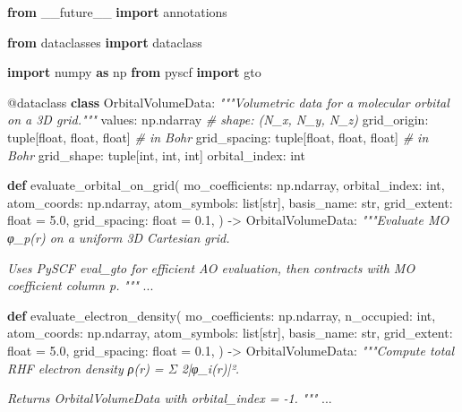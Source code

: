 \documentclass[
  11pt,
]{report}
\newenvironment{Shaded}{}{}
\newcommand{\AttributeTok}[1]{\textcolor[rgb]{0.49,0.56,0.16}{#1}}
\newcommand{\BuiltInTok}[1]{\textcolor[rgb]{0.00,0.50,0.00}{#1}}
\newcommand{\CommentTok}[1]{\textcolor[rgb]{0.38,0.63,0.69}{\textit{#1}}}
\newcommand{\FloatTok}[1]{\textcolor[rgb]{0.25,0.63,0.44}{#1}}
\newcommand{\ImportTok}[1]{\textcolor[rgb]{0.00,0.50,0.00}{\textbf{#1}}}
\newcommand{\KeywordTok}[1]{\textcolor[rgb]{0.00,0.44,0.13}{\textbf{#1}}}
\newcommand{\NormalTok}[1]{#1}
\newcommand{\OperatorTok}[1]{\textcolor[rgb]{0.40,0.40,0.40}{#1}}
\begin{document}
\begin{Shaded}
\begin{Highlighting}[]
\ImportTok{from}\NormalTok{ \_\_future\_\_ }\ImportTok{import}\NormalTok{ annotations}

\ImportTok{from}\NormalTok{ dataclasses }\ImportTok{import}\NormalTok{ dataclass}

\ImportTok{import}\NormalTok{ numpy }\ImportTok{as}\NormalTok{ np}
\ImportTok{from}\NormalTok{ pyscf }\ImportTok{import}\NormalTok{ gto}


\AttributeTok{@dataclass}
\KeywordTok{class}\NormalTok{ OrbitalVolumeData:}
    \CommentTok{"""Volumetric data for a molecular orbital on a 3D grid."""}
\NormalTok{    values: np.ndarray           }\CommentTok{\# shape: (N\_x, N\_y, N\_z)}
\NormalTok{    grid\_origin: }\BuiltInTok{tuple}\NormalTok{[}\BuiltInTok{float}\NormalTok{, }\BuiltInTok{float}\NormalTok{, }\BuiltInTok{float}\NormalTok{]    }\CommentTok{\# in Bohr}
\NormalTok{    grid\_spacing: }\BuiltInTok{tuple}\NormalTok{[}\BuiltInTok{float}\NormalTok{, }\BuiltInTok{float}\NormalTok{, }\BuiltInTok{float}\NormalTok{]   }\CommentTok{\# in Bohr}
\NormalTok{    grid\_shape: }\BuiltInTok{tuple}\NormalTok{[}\BuiltInTok{int}\NormalTok{, }\BuiltInTok{int}\NormalTok{, }\BuiltInTok{int}\NormalTok{]}
\NormalTok{    orbital\_index: }\BuiltInTok{int}


\KeywordTok{def}\NormalTok{ evaluate\_orbital\_on\_grid(}
\NormalTok{    mo\_coefficients: np.ndarray,}
\NormalTok{    orbital\_index: }\BuiltInTok{int}\NormalTok{,}
\NormalTok{    atom\_coords: np.ndarray,}
\NormalTok{    atom\_symbols: }\BuiltInTok{list}\NormalTok{[}\BuiltInTok{str}\NormalTok{],}
\NormalTok{    basis\_name: }\BuiltInTok{str}\NormalTok{,}
\NormalTok{    grid\_extent: }\BuiltInTok{float} \OperatorTok{=} \FloatTok{5.0}\NormalTok{,}
\NormalTok{    grid\_spacing: }\BuiltInTok{float} \OperatorTok{=} \FloatTok{0.1}\NormalTok{,}
\NormalTok{) }\OperatorTok{{-}\textgreater{}}\NormalTok{ OrbitalVolumeData:}
    \CommentTok{"""Evaluate MO φ\_p(r) on a uniform 3D Cartesian grid.}

\CommentTok{    Uses PySCF eval\_gto for efficient AO evaluation, then}
\CommentTok{    contracts with MO coefficient column p.}
\CommentTok{    """}
\NormalTok{    ...}


\KeywordTok{def}\NormalTok{ evaluate\_electron\_density(}
\NormalTok{    mo\_coefficients: np.ndarray,}
\NormalTok{    n\_occupied: }\BuiltInTok{int}\NormalTok{,}
\NormalTok{    atom\_coords: np.ndarray,}
\NormalTok{    atom\_symbols: }\BuiltInTok{list}\NormalTok{[}\BuiltInTok{str}\NormalTok{],}
\NormalTok{    basis\_name: }\BuiltInTok{str}\NormalTok{,}
\NormalTok{    grid\_extent: }\BuiltInTok{float} \OperatorTok{=} \FloatTok{5.0}\NormalTok{,}
\NormalTok{    grid\_spacing: }\BuiltInTok{float} \OperatorTok{=} \FloatTok{0.1}\NormalTok{,}
\NormalTok{) }\OperatorTok{{-}\textgreater{}}\NormalTok{ OrbitalVolumeData:}
    \CommentTok{"""Compute total RHF electron density ρ(r) = Σ 2|φ\_i(r)|².}

\CommentTok{    Returns OrbitalVolumeData with orbital\_index = {-}1.}
\CommentTok{    """}
\NormalTok{    ...}
\end{Highlighting}
\end{Shaded}
\end{document}
